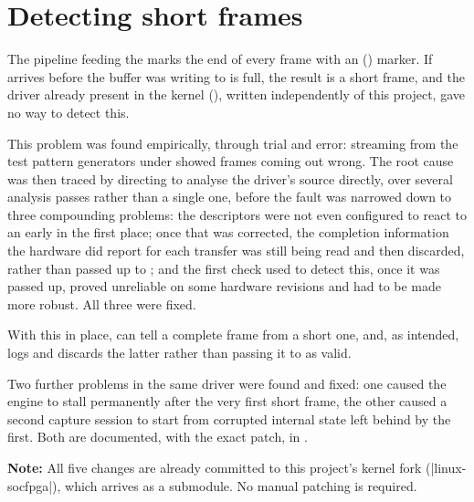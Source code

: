 \section{Detecting short frames}
\label{sec:fpgalix-camera-short-frames}

The  pipeline feeding the  marks the end of every frame with an  () marker. If  arrives before the buffer  was writing to is full, the result is a short frame, and the   driver already present in the  kernel (), written independently of this project, gave  no way to detect this.

This problem was found empirically, through trial and error: streaming from the  test pattern generators under  showed frames coming out wrong. The root cause was then traced by directing  to analyse the driver's source directly, over several analysis passes rather than a single one, before the fault was narrowed down to three compounding problems: the  descriptors were not even configured to react to an early  in the first place; once that was corrected, the completion information the hardware did report for each transfer was still being read and then discarded, rather than passed up to ; and the first check used to detect this, once it was passed up, proved unreliable on some  hardware revisions and had to be made more robust. All three were fixed.

With this in place,  can tell a complete frame from a short one, and, as intended, logs and discards the latter rather than passing it to  as valid.

Two further problems in the same driver were found and fixed: one caused the  engine to stall permanently after the very first short frame, the other caused a second capture session to start from corrupted internal state left behind by the first. Both are documented, with the exact patch, in \cite[``Kernel patch (mandatory)'']{DRV2-README}.

\textbf{Note:} All five changes are already committed to this project's  kernel fork (|linux-socfpga|), which arrives as a submodule. No manual patching is required.

